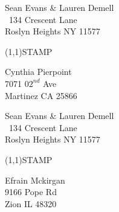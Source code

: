 \documentclass[12pt]{article}
\begin{document}
\pagestyle{empty}
\setlength{\unitlength}{1in}

\begin{minipage}{.5\linewidth} \noindent
Sean Evans \& Lauren Demell\\\ 
134 Crescent Lane\\ 
Roslyn Heights NY 11577
\end{minipage}
\begin{minipage}{.5\linewidth \hspace{-.2in} \vspace{-.3in}}
\begin{flushright}
\framebox(1,1){STAMP}
\end{flushright}
\end{minipage}

\begin{center} \begin{Huge} \vspace*{\fill}
Cynthia Pierpoint\\
7071 $02^{nd}$ Ave\\
Martinez CA 25866\\
\vspace{\fill} \end{Huge} \end{center}

\clearpage

\begin{minipage}{.5\linewidth} \noindent
Sean Evans \& Lauren Demell\\\ 
134 Crescent Lane\\ 
Roslyn Heights NY 11577
\end{minipage}
\begin{minipage}{.5\linewidth \hspace{-.2in} \vspace{-.3in}}
\begin{flushright}
\framebox(1,1){STAMP}
\end{flushright}
\end{minipage}

\begin{center} \begin{Huge} \vspace*{\fill}
Efrain Mckirgan\\
9166 Pope Rd\\
Zion IL 48320\\
\vspace{\fill} \end{Huge} \end{center}
\end{document}
